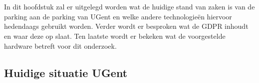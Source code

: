 \chapter{}
\label{ch:stand-van-zaken}






In dit hoofdstuk zal er uitgelegd worden wat de huidige stand van zaken is van de parking aan de parking van UGent en welke andere technologieën hiervoor hedendaags gebruikt worden.
Verder wordt er besproken wat de GDPR inhoudt en waar deze op slaat. Ten laatste wordt er bekeken wat de voorgestelde hardware betreft voor dit onderzoek.

\section{Huidige situatie UGent}

